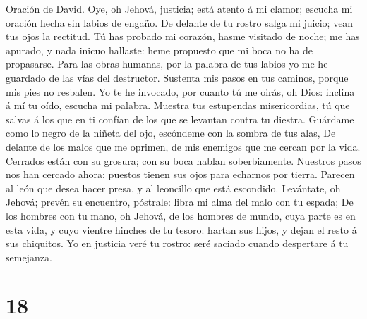  Oración de David. Oye, oh Jehová, justicia; está atento á
mi clamor; escucha mi oración hecha sin labios de engaño. 
De delante de tu rostro salga mi juicio; vean tus ojos la rectitud.
 Tú has probado mi corazón, hasme visitado de noche; me
has apurado, y nada inicuo hallaste: heme propuesto que mi boca no ha de
propasarse.  Para las obras humanas, por la palabra de tus
labios yo me he guardado de las vías del destructor. 
Sustenta mis pasos en tus caminos, porque mis pies no resbalen.
 Yo te he invocado, por cuanto tú me oirás, oh Dios:
inclina á mí tu oído, escucha mi palabra.  Muestra tus
estupendas misericordias, tú que salvas á los que en ti confían de los
que se levantan contra tu diestra.  Guárdame como lo negro
de la niñeta del ojo, escóndeme con la sombra de tus alas,
 De delante de los malos que me oprimen, de mis enemigos
que me cercan por la vida.  Cerrados están con su
grosura; con su boca hablan soberbiamente.  Nuestros
pasos nos han cercado ahora: puestos tienen sus ojos para echarnos por
tierra.  Parecen al león que desea hacer presa, y al
leoncillo que está escondido.  Levántate, oh Jehová;
prevén su encuentro, póstrale: libra mi alma del malo con tu espada;
 De los hombres con tu mano, oh Jehová, de los hombres de
mundo, cuya parte es en esta vida, y cuyo vientre hinches de tu tesoro:
hartan sus hijos, y dejan el resto á sus chiquitos.  Yo
en justicia veré tu rostro: seré saciado cuando despertare á tu
semejanza.

\hypertarget{section-17}{%
\section{18}\label{section-17}}


